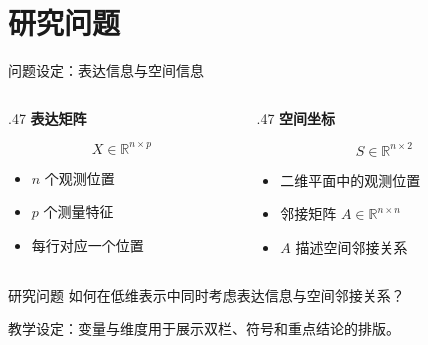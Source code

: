 \documentclass[aspectratio=169,11pt]{beamer}
\newcommand{\smallnote}[1]{\par{\scriptsize\color{Muted}#1\par}}
\newcommand{\labeltext}[1]{{\color{Teal}\bfseries #1}\par}
\newcommand{\spaceditem}{\setlength{\itemsep}{0.8em}}
\begin{document}
\section{研究问题}
\begin{frame}{问题设定：表达信息与空间信息}
  \begin{columns}[T,onlytextwidth]
    \begin{column}{.47\textwidth}
      \labeltext{表达矩阵}
      \[
        X\in\mathbb{R}^{n\times p}
      \]
      \begin{itemize}\spaceditem
        \item $n$ 个观测位置
        \item $p$ 个测量特征
        \item 每行对应一个位置
      \end{itemize}
    \end{column}
    \begin{column}{.47\textwidth}
      \labeltext{空间坐标}
      \[
        S\in\mathbb{R}^{n\times 2}
      \]
      \begin{itemize}\spaceditem
        \item 二维平面中的观测位置
        \item 邻接矩阵 $A\in\mathbb{R}^{n\times n}$
        \item $A$ 描述空间邻接关系
      \end{itemize}
    \end{column}
  \end{columns}
  \vspace{0mm}
  \begin{block}{研究问题}
    如何在低维表示中同时考虑表达信息与空间邻接关系？
  \end{block}
  \vspace{1mm}
  \smallnote{教学设定：变量与维度用于展示双栏、符号和重点结论的排版。}
\end{frame}

\end{document}
